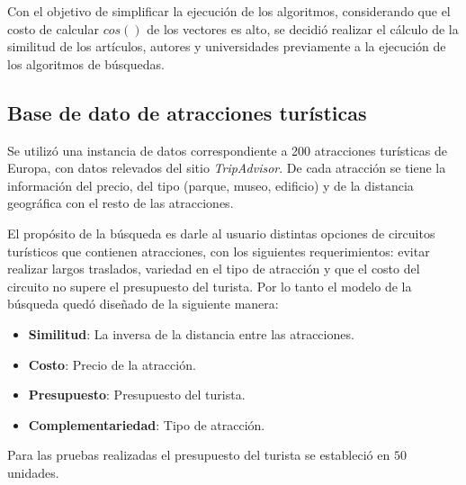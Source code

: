 
Con el objetivo de simplificar la ejecución de los algoritmos, considerando que el costo de calcular $cos()$ de los vectores es alto, se decidió realizar el cálculo de la similitud de los artículos, autores y universidades previamente a la ejecución de los algoritmos de búsquedas.

\subsection{Base de dato de atracciones turísticas}
Se utilizó una instancia de datos correspondiente a 200 atracciones turísticas de Europa, con datos relevados del sitio \textit{TripAdvisor}. De cada atracción se tiene la información del precio, del tipo (parque, museo, edificio) y de la distancia geográfica con el resto de las atracciones.

El propósito de la búsqueda es darle al usuario distintas opciones de circuitos turísticos que contienen atracciones, con los siguientes requerimientos: evitar realizar largos traslados, variedad en el tipo de atracción y que el costo del circuito no supere el presupuesto del turista. Por lo tanto el modelo de la búsqueda quedó diseñado de la siguiente manera: \label{busqueda:atracciones}

\begin{itemize}
	\item \textbf{Similitud}: La inversa de la distancia entre las atracciones. 
	\item \textbf{Costo}: Precio de la atracción. 
	\item \textbf{Presupuesto}: Presupuesto del turista. 
	\item \textbf{Complementariedad}: Tipo de atracción.
\end{itemize}

Para las pruebas realizadas el presupuesto del turista se estableció en $50$ unidades.

